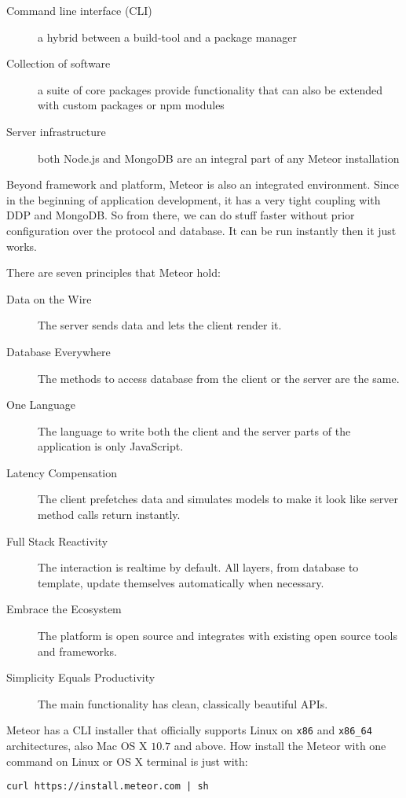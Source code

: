 \begin{description}
\item [Command line interface (CLI)] a hybrid between a build-tool and a package manager
\item [Collection of software] a suite of core packages provide functionality that can also be extended with custom packages or \ac{npm} modules
\item [Server infrastructure] both Node.js and MongoDB are an integral part of any Meteor installation
\end{description}

Beyond framework and platform, Meteor is also an integrated environment.
Since in the beginning of application development, it has a very tight coupling with \ac{DDP} and MongoDB.
So from there, we can do stuff faster without prior configuration over the protocol and database.
It can be run instantly then it just works.

\noindent There are seven principles that Meteor hold:

\begin{description}
\item [Data on the Wire] The server sends data and lets the client render it.
\item [Database Everywhere] The methods to access database from the client or the server are the same.
\item [One Language] The language to write both the client and the server parts of the application is only JavaScript.
\item [Latency Compensation] The client prefetches data and simulates models to make it look like server method calls return instantly.
\item [Full Stack Reactivity] The interaction is realtime by default. All layers, from database to template, update themselves automatically when necessary.
\item [Embrace the Ecosystem] The platform is open source and integrates with existing open source tools and frameworks.
\item [Simplicity Equals Productivity]  The main functionality has clean, classically beautiful APIs.
\end{description}

Meteor has a \ac{CLI} installer that officially supports Linux on \verb|x86| and \verb|x86_64| architectures, also Mac OS X $10.7$ and above.
How install the Meteor with one command on Linux or OS X terminal is just with:

\begin{verbatim}
curl https://install.meteor.com | sh
\end{verbatim}

